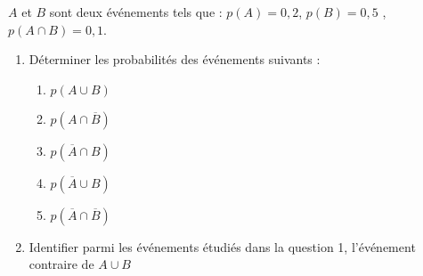 
$A$ et $B$ sont deux événements tels que :
 $ p(A)=0,2$,  $p(B)=0,5$ , $p(A \cap B) = 0,1$.

\begin{enumerate}
\item Déterminer les probabilités des événements suivants :

	\begin{enumerate}
	\item $p(A \cup B)$	
	\item $p(A \cap \overline{B})$
	\item $p(\overline{A} \cap B)$
	\item $p(\overline{A} \cup B)$
	\item $p(\overline{A} \cap \overline{B})$
	\end{enumerate}

\item Identifier parmi les événements étudiés dans la question 1, l'événement contraire de $A \cup B$
\end{enumerate}



